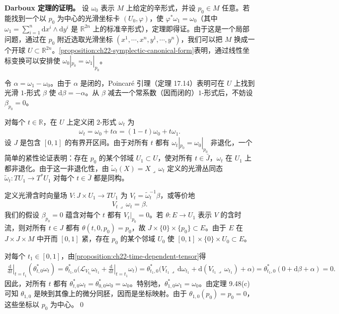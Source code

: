 \documentclass[../../main.tex]{subfiles}
\begin{document}
\textbf{Darboux 定理的证明。} 设 $\omega_0$ 表示 $M$ 上给定的辛形式，并设 $p_0\in M$ 任意。若能找到一个以 $p_0$ 为中心的光滑坐标卡 $(U_0,\varphi)$，使 $\varphi^*\omega_1=\omega_0$（其中 $\omega_1=\sum_{i=1}^n\mathrm{d}x^i\wedge\mathrm{d}y^i$ 是 $\mathbb{R}^{2n}$ 上的标准辛形式），定理即得证。由于这是一个局部问题，通过在 $p_0$ 附近选取光滑坐标 $(x^1,\cdots ,x^n,y^1,\cdots ,y^n)$，我们可以把 $M$ 换成一个开球 $U\subset\mathbb{R}^{2n}$。\cref{proposition:ch22-symplectic-canonical-form}表明，通过线性坐标变换可以安排使 $\omega_0|_{p_0}=\omega_1|_{p_0}$。

令 $\alpha=\omega_1-\omega_0$。由于 $\alpha$ 是闭的，Poincar\'e 引理（定理 17.14）表明可在 $U$ 上找到光滑 $1$-形式 $\beta$ 使 $\mathrm{d}\beta=-\alpha$。从 $\beta$ 减去一个常系数（因而闭的）$1$-形式后，不妨设 $\beta_{p_0}=0$。

对每个 $t\in\mathbb R$，在 $U$ 上定义闭 $2$-形式 $\omega_t$ 为
\begin{align*}
\omega_t=\omega_0+t\alpha=(1-t)\omega_0+t\omega_1.
\end{align*}
设 $J$ 是包含 $[0,1]$ 的有界开区间。由于对所有 $t$ 都有 $\omega_t|_{p_0}=\omega_0|_{p_0}$ 非退化，一个简单的紧性论证表明：存在 $p_0$ 的某个邻域 $U_1\subset U$，使对所有 $t\in\bar J$，$\omega_t$ 在 $U_1$ 上都非退化。由于这一非退化性，由 $\widetilde\omega_t(X)=X\lrcorner\,\omega_t$ 定义的光滑丛同态 $\widetilde\omega_t:TU_1\to T^*U_1$ 对每个 $t\in\bar J$ 都是同构。

定义光滑含时向量场 $V:J\times U_1\to TU_1$ 为 $V_t=\widetilde\omega_t^{-1}\beta$，或等价地
\begin{align*}
V_t\lrcorner\,\omega_t=\beta.
\end{align*}
我们的假设 $\beta_{p_0}=0$ 蕴含对每个 $t$ 都有 $V_t|_{p_0}=0$。若 $\theta:E\to U_1$ 表示 $V$ 的含时流，则对所有 $t\in J$ 都有 $\theta(t,0,p_0)=p_0$，故 $J\times\{0\}\times\{p_0\}\subset E$。由于 $E$ 在 $J\times J\times M$ 中开而 $[0,1]$ 紧，存在 $p_0$ 的某个邻域 $U_0$ 使 $[0,1]\times\{0\}\times U_0\subset E$。

对每个 $t_1\in[0,1]$，由\cref{proposition:ch22-time-dependent-tensor}得
\begin{align*}
\left.\frac{\mathrm{d}}{\mathrm{d}t}\right|_{t=t_1}(\theta_{t,0}^*\omega_t)
=\theta_{t_1,0}^*\big(\mathcal L_{V_{t_1}}\omega_{t_1}+\left.\frac{\mathrm{d}}{\mathrm{d}t}\right|_{t=t_1}\omega_t\big)
=\theta_{t_1,0}^*\big(V_{t_1}\lrcorner\,\mathrm{d}\omega_{t_1}+\mathrm{d}(V_{t_1}\lrcorner\,\omega_{t_1})+\alpha\big)
=\theta_{t_1,0}^*(0+\mathrm{d}\beta+\alpha)=0.
\end{align*}
因此，对所有 $t$ 都有 $\theta_{t,0}^*\omega_t=\theta_{0,0}^*\omega_0=\omega_0$。特别地，$\theta_{1,0}^*\omega_1=\omega_0$。由定理 9.48(c) 可知 $\theta_{1,0}$ 是映到其像上的微分同胚，因而是坐标映射。由于 $\theta_{1,0}(p_0)=p_0=0$，这些坐标以 $p_0$ 为中心。\qed
\end{document}
